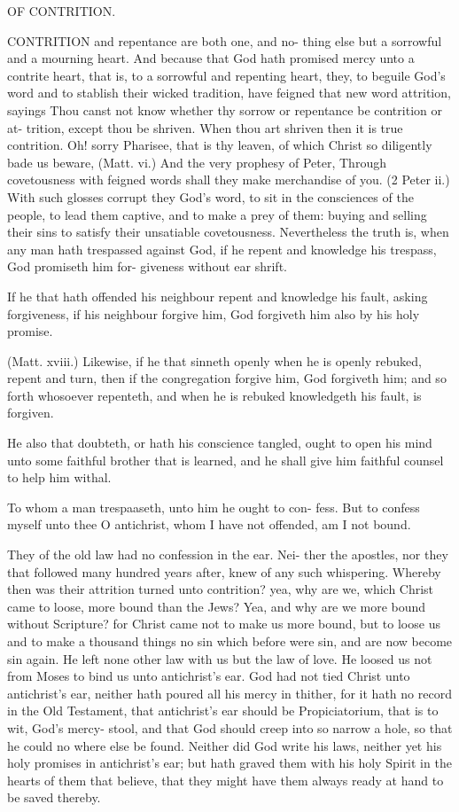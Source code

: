 \documentclass{custom}
\begin{document}
OF CONTRITION. 

CONTRITION and repentance are both one, and no- 
thing else but a sorrowful and a mourning heart. And 
because that God hath promised mercy unto a contrite heart, 
that is, to a sorrowful and repenting heart, they, to beguile 
God's word and to stablish their wicked tradition, have 
feigned that new word attrition, sayings Thou canst not 
know whether thy sorrow or repentance be contrition or at- 
trition, except thou be shriven. When thou art shriven then 
it is true contrition. Oh! sorry Pharisee, that is thy leaven, 
of which Christ so diligently bade us beware, (Matt. vi.) 
And the very prophesy of Peter, Through covetousness 
with feigned words shall they make merchandise of you. 
(2 Peter ii.) With such glosses corrupt they God's word, to 
sit in the consciences of the people, to lead them captive, 
and to make a prey of them: buying and selling their sins 
to satisfy their unsatiable covetousness. Nevertheless the 
truth is, when any man hath trespassed against God, if he 
repent and knowledge his trespass, God promiseth him for- 
giveness without ear shrift. 

If he that hath offended his neighbour repent and 
knowledge his fault, asking forgiveness, if his neighbour 
forgive him, God forgiveth him also by his holy promise. 


(Matt. xviii.) Likewise, if he that sinneth openly when he is 
openly rebuked, repent and turn, then if the congregation 
forgive him, God forgiveth him; and so forth whosoever 
repenteth, and when he is rebuked knowledgeth his fault, is 
forgiven.

He also that doubteth, or hath his conscience tangled, 
ought to open his mind unto some faithful brother that is 
learned, and he shall give him faithful counsel to help him 
withal.

To whom a man trespaaseth, unto him he ought to con-
fess. But to confess myself unto thee O antichrist, whom I 
have not offended, am I not bound. 

They of the old law had no confession in the ear. Nei- 
ther the apostles, nor they that followed many hundred years 
after, knew of any such whispering. Whereby then was their 
attrition turned unto contrition? yea, why are we, which 
Christ came to loose, more bound than the Jews? Yea, 
and why are we more bound without Scripture? for Christ 
came not to make us more bound, but to loose us and to 
make a thousand things no sin which before were sin, and 
are now become sin again. He left none other law with us 
but the law of love. He loosed us not from Moses to bind 
us unto antichrist's ear. God had not tied Christ unto 
antichrist's ear, neither hath poured all his mercy in thither, 
for it hath no record in the Old Testament, that antichrist's 
ear should be Propiciatorium, that is to wit, God's mercy- 
stool, and that God should creep into so narrow a hole, so 
that he could no where else be found. Neither did 
God write his laws, neither yet his holy promises in 
antichrist's ear; but hath graved them with his holy Spirit 
in the hearts of them that believe, that they might have 
them always ready at hand to be saved thereby. 
\end{document}

